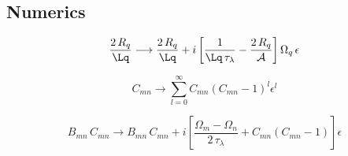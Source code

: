 
 \subsection{Numerics}
\begin{equation}
  \frac{2\, R_q}{\Lq} \longrightarrow \frac{2\, R_q}{\Lq} + i \left[ \frac{1}{\Lq\, \tau_\lambda} - \frac{2\, R_q}{\mathcal{A}} \right] \Omega_q\, \epsilon
\end{equation}

\begin{equation}
  C_{m n} \longrightarrow \sum_{l = 0}^\infty C_{m n} \left(C_{m n} - 1\right)^l \epsilon^l
\end{equation}

\begin{equation}
  B_{m n}\, C_{m n} \longrightarrow B_{m n}\, C_{m n} + i \left[ \frac{\Omega_m - \Omega_n}{2\, \tau_\lambda} + C_{m n} \left(C_{m n} - 1\right) \right] \epsilon
\end{equation}


